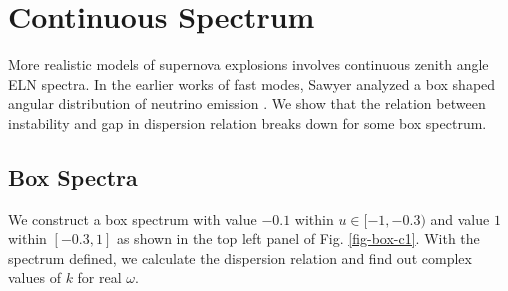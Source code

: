 \documentclass[%
preprint,
 amsmath,amssymb,
 aps,
 prd
]{revtex4-1}
\begin{document}
\section{\label{sec-continuous-spectrum}Continuous Spectrum}

More realistic models of supernova explosions involves continuous zenith angle ELN spectra. In the earlier works of fast modes, Sawyer analyzed a box shaped angular distribution of neutrino emission \cite{Sawyer2016}. We show that the relation between instability and gap in dispersion relation breaks down for some box spectrum.

\subsection{\label{sec-boxspectrum}Box Spectra}

We construct a box spectrum with value $-0.1$ within $u\in [-1,-0.3)$ and value $1$ within $[-0.3,1]$ as shown in the top left panel of Fig. \ref{fig-box-c1}. With the spectrum defined, we calculate the dispersion relation and find out complex values of $k$ for real $\omega$.
\end{document}
